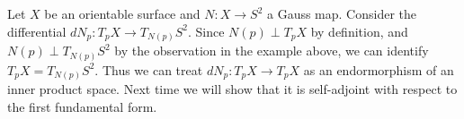 \documentclass[a4paper]{article}
\begin{document}
Let \(X\) be an orientable surface and \(N: X \to S^2\) a Gauss map. Consider the differential \(dN_p: T_pX \to T_{N(p)}S^2\). Since \(N(p) \perp T_pX\) by definition, and \(N(p) \perp T_{N(p)} S^2\) by the observation in the example above, we can identify \(T_pX = T_{N(p)}S^2\). Thus we can treat \(dN_p: T_pX \to T_pX\) as an endormorphism of an inner product space. Next time we will show that it is self-adjoint with respect to the first fundamental form.


\printindex

\iffalse
Classical differential geometry concerning geometries of curves and surfaces, from a modern point of view

Contents:
I: notions of smmoth \(k\)-dim manifolds. We study differential topology.

Geometry is concerned with the study of rigid motions

invariants of curves: \(k\) curvature, \(\tau\) torsion
invariant of surfaces: \(K\) mean curvature, \(K\) Gaussian curvature
\fi
\end{document}
